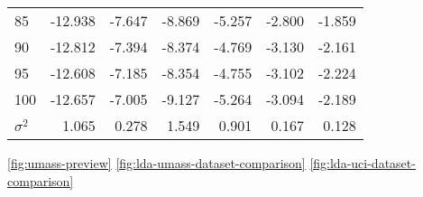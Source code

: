 \documentclass[letterpaper,12pt]{article}
\begin{document}
\begin{table}
\begin{center}
\begin{tabular}{| l | rr | rr | rr |}
				85  & -12.938 & -7.647 &      -8.869 & -5.257 &  -2.800 & -1.859 \\
				90  & -12.812 & -7.394 &      -8.374 & -4.769 &  -3.130 & -2.161 \\
				95  & -12.608 & -7.185 &      -8.354 & -4.755 &  -3.102 & -2.224 \\
				100 & -12.657 & -7.005 &      -9.127 & -5.264 &  -3.094 & -2.189 \\
			\hline
			$\sigma^2$ & 1.065 & 0.278 & 1.549 & 0.901 & 0.167 & 0.128 \\
			\hline
			\end{tabular}
	\end{center}
\end{table}
\ref{fig:umass-preview}
\ref{fig:lda-umass-dataset-comparison}
\ref{fig:lda-uci-dataset-comparison}
\end{document}
